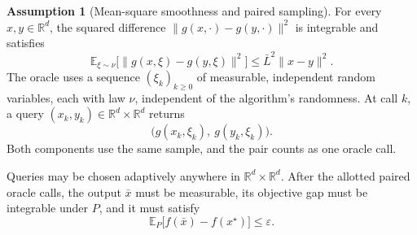 \documentclass[10pt]{article}
\theoremstyle{definition}
\newtheorem{assumption}{Assumption}
\begin{document}
\begin{assumption}[Mean-square smoothness and paired sampling]
For every $x,y\in\mathbb{R}^d$, the squared difference $\|g(x,\cdot)-g(y,\cdot)\|^2$ is integrable and satisfies
\[
\mathbb{E}_{\xi\sim\nu}
 \bigl[\|g(x,\xi)-g(y,\xi)\|^2\bigr]
\leq \bar{L}^2\|x-y\|^2.
\]
The oracle uses a sequence $(\xi_k)_{k\geq0}$ of measurable, independent random variables, each with law $\nu$, independent of the algorithm's randomness. At call $k$, a query $(x_k,y_k)\in\mathbb{R}^d\times\mathbb{R}^d$ returns
\[
\bigl(g(x_k,\xi_k),\ g(y_k,\xi_k)\bigr).
\]
Both components use the same sample, and the pair counts as one oracle call.
\end{assumption}

Queries may be chosen adaptively anywhere in $\mathbb{R}^d\times\mathbb{R}^d$. After the allotted paired oracle calls, the output $\bar{x}$ must be measurable, its objective gap must be integrable under $P$, and it must satisfy
\[
\mathbb{E}_{P}\bigl[f(\bar{x})-f(x^\star)\bigr]
\leq\varepsilon.
\]
\end{document}
